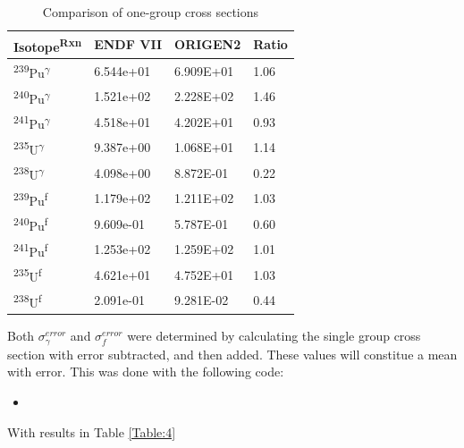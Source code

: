 \documentclass[11pt,notitlepage]{article}
\newcommand{\tss}{\textsuperscript}
\newcommand{\pythonscript}[2]{
\begin{itemize}
\item[]
\end{itemize}
}
\begin{document}
\begin{todolist}
  \begin{table}[H]
  \begin{center}
    \caption{Comparison of one-group cross sections}
    \label{Table:3}
    \begin{tabular}{l l l l}
      \toprule
      Isotope\tss{Rxn} & ENDF VII & ORIGEN2 & Ratio\\
      \hline
      \tss{239}Pu\tss{$\gamma$} & 6.544e+01 & 6.909E+01 & 1.06\\
      \tss{240}Pu\tss{$\gamma$} & 1.521e+02 & 2.228E+02 & 1.46\\
      \tss{241}Pu\tss{$\gamma$} & 4.518e+01 & 4.202E+01 & 0.93\\
      \tss{235}U\tss{$\gamma$}  & 9.387e+00 & 1.068E+01 & 1.14\\
      \tss{238}U\tss{$\gamma$}  & 4.098e+00 & 8.872E-01 & 0.22\\
      \tss{239}Pu\tss{f} & 1.179e+02 & 1.211E+02 & 1.03\\
      \tss{240}Pu\tss{f} & 9.609e-01 & 5.787E-01 & 0.60\\
      \tss{241}Pu\tss{f} & 1.253e+02 & 1.259E+02 & 1.01\\
      \tss{235}U\tss{f}  & 4.621e+01 & 4.752E+01 & 1.03\\
      \tss{238}U\tss{f}  & 2.091e-01 & 9.281E-02 & 0.44\\
      \bottomrule
    \end{tabular}
  \end{center}
  \end{table}

  Both $\sigma^{error}_\gamma$ and $\sigma^{error}_f$
  were determined by calculating the single group cross section
  with error subtracted, and then added. These values will
  constitue a mean with error. This was done with the following code:

  \pythonscript{../Weighting/Cal_Sig_w_Err}{Script calculating average x-sections}

  With results in Table \ref{Table:4}


\end{todolist}
\end{document}
